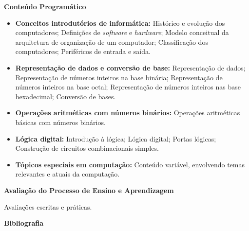 \begin{snugshade}\begin{center}\textbf{
    Conteúdo Programático
}\end{center}\end{snugshade}

\begin{itemize}

 \item \textbf{Conceitos introdut\'orios de inform\'atica:} Histórico e evolução dos computadores; Defini\c{c}\~oes de \textit{software} e \textit{hardware}; Modelo conceitual da arquitetura de organiza\c{c}\~ao de um computador; Classifica\c{c}\~ao dos computadores; Perif\'ericos de entrada e sa\'ida.

 \item \textbf{Representa\c{c}\~ao de dados e convers\~ao de base:} Representação de dados; Representação de números inteiros na base binária; Representação de números inteiros na base octal; Representação de números inteiros nas base hexadecimal; Convers\~ao de bases.

 \item \textbf{Opera\c{c}\~oes aritm\'eticas com n\'umeros bin\'arios:} Opera\c{c}\~oes aritm\'eticas b\'asicas com n\'umeros bin\'arios.

 \item \textbf{L\'ogica digital:} Introdu\c{c}\~ao \`a l\'ogica; L\'ogica digital; Portas l\'ogicas; Constru\c{c}\~ao de circuitos combinacionais simples.

 \item \textbf{T\'opicos especiais em computa\c{c}\~ao:} Conte\'udo vari\'avel, envolvendo temas relevantes e atuais da computa\c{c}\~ao.

\end{itemize}



\begin{snugshade}\begin{center}\textbf{
    Avaliação do Processo de Ensino e Aprendizagem
}\end{center}\end{snugshade}

\noindent
          Avaliações escritas e pr\'aticas.




\begin{snugshade}\begin{center}\textbf{
    Bibliografia
}\end{center}\end{snugshade}

